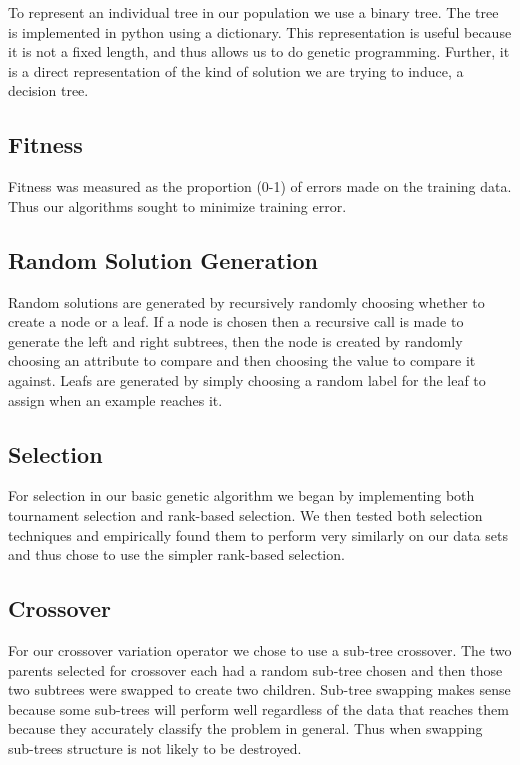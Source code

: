 \documentclass{acm_proc_article-sp}
\begin{document}
To represent an individual tree in our population we use a binary tree. The tree is implemented in python using a dictionary. This representation is useful because it is not a fixed length, and thus allows us to do genetic programming. Further, it is a direct representation of the kind of solution we are trying to induce, a decision tree.

\subsection{Fitness}

Fitness was measured as the proportion (0-1) of errors made on the training data. Thus our algorithms sought to minimize training error.

\subsection{Random Solution Generation}

Random solutions are generated by recursively randomly choosing whether to create a node or a leaf. If a node is chosen then a recursive call is made to generate the left and right subtrees, then the node is created by randomly choosing an attribute to compare and then choosing the value to compare it against. Leafs are generated by simply choosing a random label for the leaf to assign when an example reaches it.

\subsection{Selection}

For selection in our basic genetic algorithm we began by implementing both tournament selection and rank-based selection. We then tested both selection techniques and empirically found them to perform very similarly on our data sets and thus chose to use the simpler rank-based selection.

\subsection{Crossover}

For our crossover variation operator we chose to use a sub-tree crossover. The two parents selected for crossover each had a random sub-tree chosen and then those two subtrees were swapped to create two children. Sub-tree swapping makes sense because some sub-trees will perform well regardless of the data that reaches them because they accurately classify the problem in general. Thus when swapping sub-trees structure is not likely to be destroyed.
\end{document}
